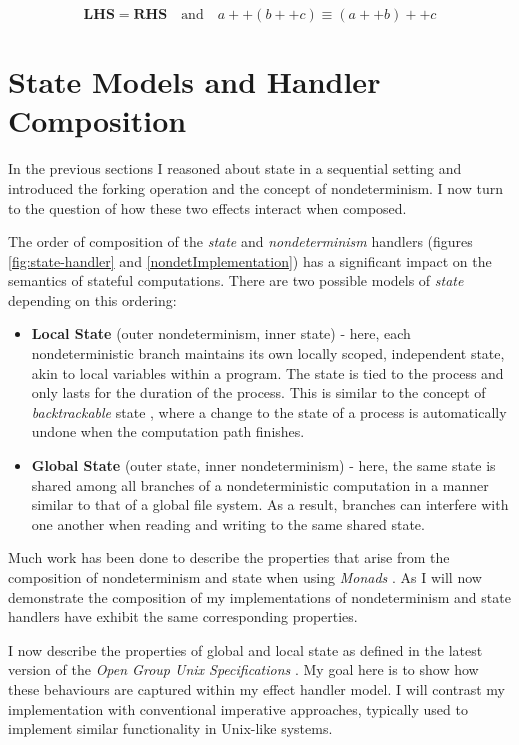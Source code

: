 \documentclass[logo,bsc,singlespacing,parskip]{infthesis}
\begin{document}
\[
\textbf{LHS} = \textbf{RHS} \quad \text{and} \quad a ++ (b ++ c) \equiv (a ++ b) ++ c
\]




\section{State Models and Handler Composition}
In the previous sections I reasoned about state in a  sequential setting and introduced the forking operation and the concept of nondeterminism. I now turn to the question of how these two effects interact when composed. 

The order of composition of the \textit{state}  and \textit{nondeterminism} handlers (figures \ref{fig:state-handler} and \ref{nondetImplementation}) has a significant impact on the semantics of stateful computations. There are two possible models of \textit{state}  depending on this ordering: 
\begin{itemize}
    \item \textbf{Local State} (outer nondeterminism, inner state) - here, each nondeterministic branch maintains its own locally scoped, independent state, akin to local variables within a program.  The state is tied to the process and only lasts for the duration of the process. This is similar to the concept of \textit{backtrackable} state \cite{backtrackable}, where a change to the state of a process is automatically undone when the computation path finishes. 
    \item \textbf{Global State} (outer state, inner nondeterminism) - here, the same state is shared among all branches of a nondeterministic computation in a manner similar to that  of a global file system. As a result, branches can interfere with one another when reading and writing to the same shared state.
\end{itemize}


Much work has been done to describe the properties that arise from the composition of nondeterminism and state when using \textit{Monads} \cite{monads}. As I will now demonstrate the composition of my implementations of nondeterminism and state handlers have exhibit the same corresponding properties. 

I now describe the properties of global and local state as defined in the latest version of the \textit{Open Group Unix Specifications} \cite{posix}. My goal here is to show how these behaviours are captured within my effect handler model. I will contrast my implementation with conventional imperative approaches, typically used to implement similar functionality in Unix-like systems. 
\end{document}
